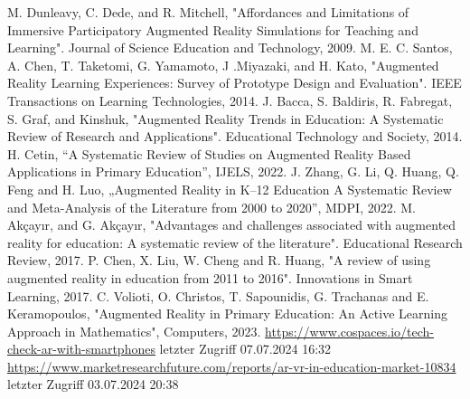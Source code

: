 \documentclass[conference]{IEEEtran}
\begin{document}
\begin{thebibliography}{00}
  M. Dunleavy, C. Dede, and R. Mitchell, "Affordances and Limitations of Immersive Participatory Augmented Reality Simulations for Teaching and Learning". Journal of Science Education and Technology, 2009.
 M. E. C. Santos, A. Chen, T. Taketomi, G. Yamamoto, J .Miyazaki, and H. Kato, "Augmented Reality Learning Experiences: Survey of Prototype
Design and Evaluation". IEEE Transactions on Learning Technologies, 2014.
 J. Bacca, S. Baldiris, R. Fabregat, S. Graf, and Kinshuk, "Augmented Reality Trends in Education: A Systematic Review of Research and Applications". Educational Technology and Society, 2014.
 H. Cetin, “A Systematic Review of Studies on Augmented Reality Based Applications in Primary Education”, IJELS, 2022.
 J. Zhang, G. Li, Q. Huang, Q. Feng and H. Luo, „Augmented Reality in K–12 Education A Systematic Review and Meta-Analysis of the Literature from 2000 to 2020”, MDPI, 2022.
 M. Akçayır, and G. Akçayır, "Advantages and challenges associated with augmented reality for education: A systematic review of the literature". Educational Research Review, 2017.
 P. Chen, X. Liu, W. Cheng and R. Huang, "A review of using augmented reality in education from 2011 to 2016". Innovations in Smart Learning, 2017.
 C. Volioti, O. Christos, T. Sapounidis, G. Trachanas and E. Keramopoulos, "Augmented Reality in Primary Education: An Active Learning Approach in Mathematics", Computers, 2023.
 \href{https://www.cospaces.io/tech-check-ar-with-smartphones}{https://www.cospaces.io/tech-check-ar-with-smartphones} letzter Zugriff 07.07.2024 16:32
 \href{https://www.marketresearchfuture.com/reports/ar-vr-in-education-market-10834}{https://www.marketresearchfuture.com/reports/ar-vr-in-education-market-10834} letzter Zugriff 03.07.2024 20:38
\end{thebibliography}
\vspace{12pt}
\end{document}
